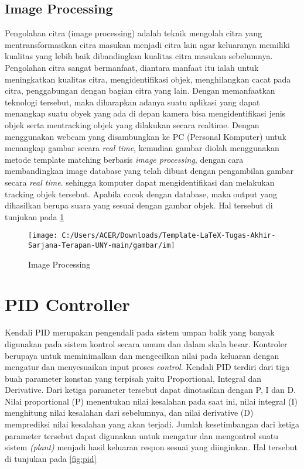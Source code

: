 \subsection{Image Processing}
Pengolahan citra (image processing) adalah teknik mengolah citra yang mentransformasikan citra masukan menjadi citra lain agar keluaranya memiliki kualitas yang lebih baik dibandingkan kualitas citra masukan sebelumnya\cite{jauharin2015pengolahan}. Pengolahan citra sangat bermanfaat, diantara manfaat itu ialah untuk meningkatkan kualitas citra, mengidentifikasi objek, menghilangkan cacat pada citra, penggabungan dengan bagian citra yang lain. Dengan memanfaatkan teknologi tersebut, maka diharapkan adanya suatu aplikasi yang dapat menangkap suatu obyek yang ada di depan kamera bisa mengidentifikasi jenis objek serta mentracking objek yang dilakukan secara realtime. Dengan menggunakan webcam yang disambungkan ke PC (Personal Komputer) untuk menangkap gambar secara \textit{real time}, kemudian gambar diolah menggunakan metode template matching berbasis \textit{image processing}, dengan cara membandingkan image database yang telah dibuat dengan pengambilan gambar secara \textit{real time}. sehingga komputer dapat mengidentifikasi dan melakukan tracking objek tersebut. Apabila cocok dengan database, maka output yang dihasilkan berupa suara yang sesuai dengan gambar objek. Hal tersebut di tunjukan pada \cref{fig:im}

\begin{figure}[H]
	\centering
	\texttt{[image: C:/Users/ACER/Downloads/Template-LaTeX-Tugas-Akhir-Sarjana-Terapan-UNY-main/gambar/im]}
	\caption{Image Processing}
	\label{fig:im}
\end{figure}


\section{PID Controller}
Kendali PID merupakan pengendali pada sistem umpan balik yang banyak digunakan pada sistem kontrol secara umum dan dalam skala besar. Kontroler berupaya untuk meminimalkan dan mengecilkan nilai pada keluaran dengan mengatur dan menyesuaikan input proses \textit{control}. Kendali PID terdiri dari tiga buah parameter konstan yang terpisah yaitu Proportional, Integral dan Derivative. Dari ketiga parameter tersebut dapat dinotasikan dengan P, I dan D\cite{leal2021design}. Nilai proportional (P) menentukan nilai kesalahan pada saat ini, nilai integral (I) menghitung nilai kesalahan dari sebelumnya, dan nilai derivative (D) memprediksi nilai kesalahan yang akan terjadi. Jumlah kesetimbangan dari ketiga parameter tersebut dapat digunakan untuk mengatur dan mengontrol suatu sistem  \textit{(plant)} menjadi hasil keluaran respon sesuai yang diinginkan. Hal tersebut di tunjukan pada \cref{fig:pid}

